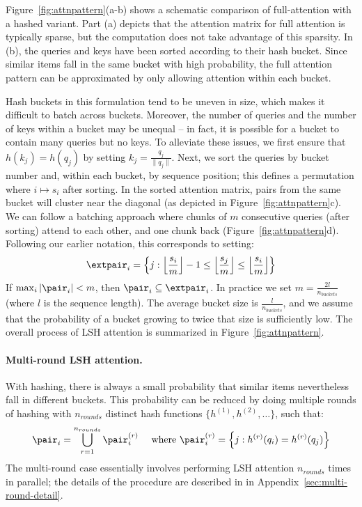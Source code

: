 Figure~\ref{fig:attnpattern}(a-b) shows a schematic comparison of full-attention with a hashed variant. Part (a) depicts that the attention matrix for full attention is typically sparse, but the computation does not take advantage of this sparsity. In (b), the queries and keys have been sorted according to their hash bucket. Since similar items fall in the same bucket with high probability, the full attention pattern can be approximated by only allowing attention within each bucket.

Hash buckets in this formulation tend to be uneven in size, which makes it difficult to batch across buckets. Moreover, the number of queries and the number of keys within a bucket may be unequal -- in fact, it is possible for a bucket to contain many queries but no keys. To alleviate these issues, we first ensure that $h(k_j) = h(q_j)$ by setting $k_j = \frac{q_j}{\|q_j\|}$. Next, we sort the queries by bucket number and, within each bucket, by sequence position; this defines a permutation where $i \mapsto s_i$ after sorting. In the sorted attention matrix, pairs from the same bucket will cluster near the diagonal (as depicted in Figure~\ref{fig:attnpattern}c). We can follow a batching approach where chunks of $m$ consecutive queries (after sorting) attend to each other, and one chunk back (Figure~\ref{fig:attnpattern}d). Following our earlier notation, this corresponds to setting:
\begin{equation}
    \extpair_i = \left\{ j : \left\lfloor \frac{s_i}{m}\right\rfloor - 1 \leq \left\lfloor \frac{s_j}{m}\right\rfloor \leq  \left\lfloor \frac{s_i}{m}\right\rfloor \right\}
\end{equation}
If $\max_i \left|\pair_i\right| < m$, then $\pair_i \subseteq \extpair_i$. In practice we set $m = \frac{2l}{n_{buckets}}$ (where $l$ is the sequence length). The average bucket size is $\frac{l}{n_{buckets}}$, and we assume that the probability of a bucket growing to twice that size is sufficiently low.
The overall process of LSH attention is summarized in Figure~\ref{fig:attnpattern}.

\paragraph{Multi-round LSH attention.}
With hashing, there is always a small probability that similar items nevertheless fall in different buckets. This probability can be reduced by doing multiple rounds of hashing with $n_{rounds}$ distinct hash functions $\{h^{(1)}, h^{(2)}, \ldots\}$, such that:
\begin{align}\label{eq:union-pairs}
    &\pair_i = \bigcup_{r=1}^{n_{rounds}} \pair^{(r)}_i
    & \text{ where } \pair^{(r)}_i = \left\{ j : h^{(r)}(q_i) = h^{(r)}(q_j) \right\}
\end{align}
The multi-round case essentially involves performing LSH attention $n_{rounds}$ times in parallel; the details of the procedure are described in in Appendix~\ref{sec:multi-round-detail}.

